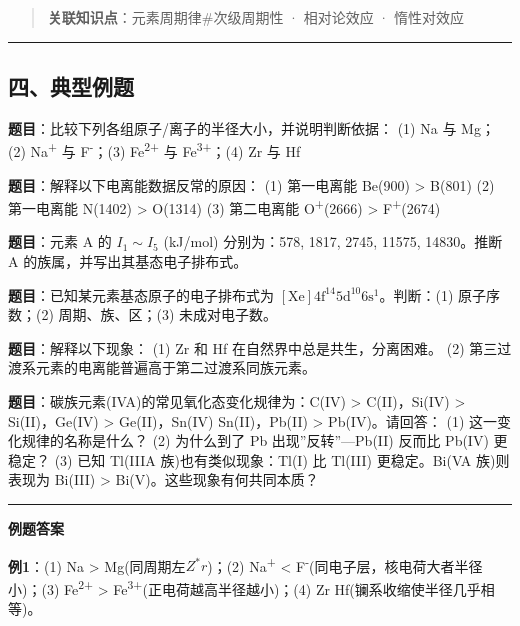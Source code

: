 \begin{quote}
\textbf{关联知识点}：元素周期律\#次级周期性 · 相对论效应 · 惰性对效应
\end{quote}

\begin{center}\rule{0.5\linewidth}{0.5pt}\end{center}

\subsection{四、典型例题}\label{ux56dbux5178ux578bux4f8bux9898}

\textbf{题目}：比较下列各组原子/离子的半径大小，并说明判断依据：
(1) Na 与 Mg；(2) Na\textsuperscript{+} 与 F\textsuperscript{-}；(3) Fe\textsuperscript{2+} 与 Fe\textsuperscript{3+}；(4) Zr 与 Hf

\textbf{题目}：解释以下电离能数据反常的原因：
(1) 第一电离能 Be(900) \textgreater{} B(801)
(2) 第一电离能 N(1402) \textgreater{} O(1314)
(3) 第二电离能 O\textsuperscript{+}(2666) \textgreater{} F\textsuperscript{+}(2674)

\textbf{题目}：元素 A 的 \(I_1\sim I_5\) (kJ/mol) 分别为：578, 1817, 2745, 11575, 14830。推断 A 的族属，并写出其基态电子排布式。

\textbf{题目}：已知某元素基态原子的电子排布式为 \([\mathrm{Xe}] 4\mathrm{f}^{14} 5\mathrm{d}^{10} 6\mathrm{s}^1\)。判断：(1) 原子序数；(2) 周期、族、区；(3) 未成对电子数。

\textbf{题目}：解释以下现象：
(1) Zr 和 Hf 在自然界中总是共生，分离困难。
(2) 第三过渡系元素的电离能普遍高于第二过渡系同族元素。

\textbf{题目}：碳族元素(IVA)的常见氧化态变化规律为：C(IV) \textgreater{} C(II)，Si(IV) \textgreater{} Si(II)，Ge(IV) \textgreater{} Ge(II)，Sn(IV)  Sn(II)，Pb(II) \textgreater{} Pb(IV)。请回答：
(1) 这一变化规律的名称是什么？
(2) 为什么到了 Pb 出现''反转''---Pb(II) 反而比 Pb(IV) 更稳定？
(3) 已知 Tl(IIIA 族)也有类似现象：Tl(I) 比 Tl(III) 更稳定。Bi(VA 族)则表现为 Bi(III) \textgreater{} Bi(V)。这些现象有何共同本质？

\begin{center}\rule{0.5\linewidth}{0.5pt}\end{center}

\textbf{例题答案}

\textbf{例1}：(1) Na \textgreater{} Mg(同周期左 \(Z^*\) \(r\))；(2) Na\textsuperscript{+} \textless{} F\textsuperscript{-}(同电子层，核电荷大者半径小)；(3) Fe\textsuperscript{2+} \textgreater{} Fe\textsuperscript{3+}(正电荷越高半径越小)；(4) Zr  Hf(镧系收缩使半径几乎相等)。

